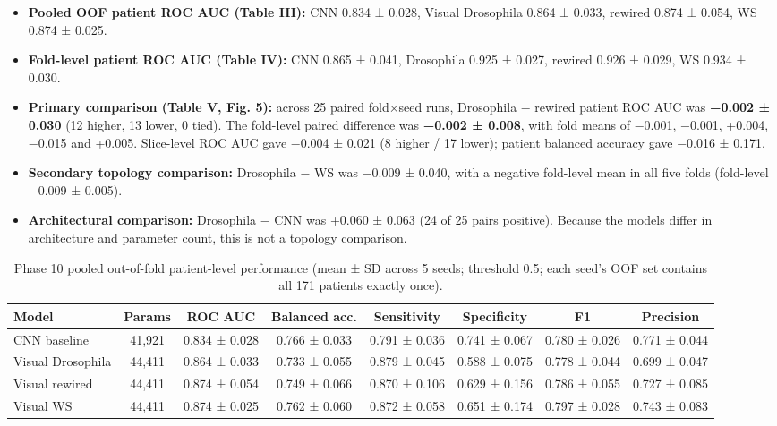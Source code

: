 \begin{itemize}
\item \textbf{Pooled OOF patient ROC AUC (Table III):} CNN 0.834 ± 0.028, Visual Drosophila 0.864 ± 0.033, rewired 0.874 ± 0.054, WS 0.874 ± 0.025.
\item \textbf{Fold-level patient ROC AUC (Table IV):} CNN 0.865 ± 0.041, Drosophila 0.925 ± 0.027, rewired 0.926 ± 0.029, WS 0.934 ± 0.030.
\item \textbf{Primary comparison (Table V, Fig. 5):} across 25 paired fold×seed runs, Drosophila − rewired patient ROC AUC was \textbf{−0.002 ± 0.030} (12 higher, 13 lower, 0 tied). The fold-level paired difference was \textbf{−0.002 ± 0.008}, with fold means of −0.001, −0.001, +0.004, −0.015 and +0.005. Slice-level ROC AUC gave −0.004 ± 0.021 (8 higher / 17 lower); patient balanced accuracy gave −0.016 ± 0.171.
\item \textbf{Secondary topology comparison:} Drosophila − WS was −0.009 ± 0.040, with a negative fold-level mean in all five folds (fold-level −0.009 ± 0.005).
\item \textbf{Architectural comparison:} Drosophila − CNN was +0.060 ± 0.063 (24 of 25 pairs positive). Because the models differ in architecture and parameter count, this is not a topology comparison.
\end{itemize}

\begin{table}[!t]
\centering
\footnotesize
\caption{Phase 10 pooled out-of-fold patient-level performance (mean ± SD across 5 seeds; threshold 0.5; each seed's OOF set contains all 171 patients exactly once).}
\label{tab:III}
\begin{tabular}{lccccccc}
\toprule
\textbf{Model} & \textbf{Params} & \textbf{ROC AUC} & \textbf{Balanced acc.} & \textbf{Sensitivity} & \textbf{Specificity} & \textbf{F1} & \textbf{Precision} \\
\midrule
CNN baseline & 41,921 & 0.834 ± 0.028 & 0.766 ± 0.033 & 0.791 ± 0.036 & 0.741 ± 0.067 & 0.780 ± 0.026 & 0.771 ± 0.044 \\
Visual Drosophila & 44,411 & 0.864 ± 0.033 & 0.733 ± 0.055 & 0.879 ± 0.045 & 0.588 ± 0.075 & 0.778 ± 0.044 & 0.699 ± 0.047 \\
Visual rewired & 44,411 & 0.874 ± 0.054 & 0.749 ± 0.066 & 0.870 ± 0.106 & 0.629 ± 0.156 & 0.786 ± 0.055 & 0.727 ± 0.085 \\
Visual WS & 44,411 & 0.874 ± 0.025 & 0.762 ± 0.060 & 0.872 ± 0.058 & 0.651 ± 0.174 & 0.797 ± 0.028 & 0.743 ± 0.083 \\
\bottomrule
\end{tabular}
\end{table}

